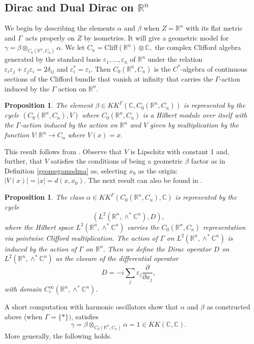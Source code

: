 \documentclass[a4paper,reqno]{amsart}
\numberwithin{equation}{section}
\def\C{\mathbb{C}}
\def\R{\mathbb{R}}
\newtheorem{prop}[thm]{Proposition}
\theoremstyle{definition}
\theoremstyle{remark}
\begin{document}
\subsection{Dirac and Dual Dirac on $\R^n$}
We begin by describing the elements $\alpha$ and $\beta$ when $Z = \R^n$ with its flat metric and $\Gamma$ acts properly on $Z$ by isometries. It will give a geometric model for $\gamma = \beta \otimes_{C_0(\R^n,C_n)} \alpha.$ We let $C_n = \text{Cliff}(\R^n) \otimes \C,$ the complex Clifford algebra generated by the standard basis $\varepsilon_1, \ldots, \varepsilon_n$ of $\R^n$ under the relation $\varepsilon_i\varepsilon_j + \varepsilon_j \varepsilon_i = 2 \delta_{ij}$ and $\varepsilon_i^* = \varepsilon_i.$ Then $C_0(\R^n,C_n)$ is the $C^*$-algebra of continuous sections of the Clifford bundle that vanish at infinity that carries the $\Gamma$-action induced by the $\Gamma$ action on $\R^n.$ 

\begin{prop}
\label{RnDD}
    The element $\beta \in KK^\Gamma(\C,C_0(\R^n, C_n))$ is represented by the cycle $(C_0(\R^n, C_n),V)$ where $C_0(\R^n, C_n)$ is a Hilbert module over itself with the $\Gamma$-action induced by the action on $\R^n$ and $V$ given by multiplication by the function $V: \R^n \to C_n$ where $V(x) =x.$
\end{prop}

This result follows from \cite{kaspinv}. Observe that $V$ is Lipschitz with constant 1 and, further, that $V$ satisfies the conditions of being a geometric $\beta$ factor as in Definition \ref{geomegamadma} as, selecting $x_0$ as the origin: $|V(x)| = |x| = d(x,x_0)$. The next result can also be found in \cite{kaspinv}.


\begin{prop}
\label{RnD}
The class $\alpha \in KK^\Gamma(C_0(\R^n,C_n), \C)$ is represented by the cycle 
$$(L^2(\R^n,\wedge^*\C^n),D),$$ 
where the Hilbert space $L^2(\R^n,\wedge^*\C^n)$ carries the $C_0(\R^n, C_n)$ representation via pointwise Clifford multiplication. The action of $\Gamma$ on $L^2(\R^n,\wedge^*\C^n)$ is induced by the action of $\Gamma$ on $\R^n.$ Then we define the Dirac operator $D$ on $L^2(\R^n,\wedge^*\C^n)$ as the closure of the differential operator
$$D = \displaystyle - i \sum_j \varepsilon_j \frac{\partial}{\partial x_j},$$ 
with domain $C^\infty_c(\R^n,\wedge^*\C^n)$.
\end{prop} 

A short computation with harmonic oscillators show that $\alpha$ and $\beta$ as constructed above (when $\Gamma =\{*\})$, satisfies 
$$\gamma = \beta \otimes_{C_0(\R^n, C_n)} \alpha = 1 \in KK(\C,\C).$$
More generally, the following holds.
\end{document}
